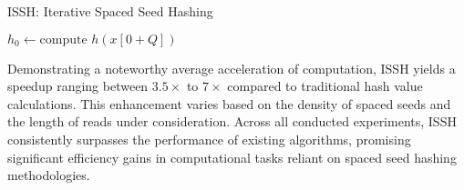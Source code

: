 \begin{algorithm}[!ht]
	\caption{ISSH: Iterative Spaced Seed Hashing}
	\label{alg:ISSH}
	$h_0 \gets \text{compute } h(x[0 + Q])$\;
\end{algorithm}

Demonstrating a noteworthy average acceleration of computation, \acs{ISSH} yields a speedup ranging between $3.5\times$ to $7\times$ compared to traditional hash value calculations. This enhancement varies based on the density of spaced seeds and the length of reads under consideration. Across all conducted experiments, \acs{ISSH} consistently surpasses the performance of existing algorithms, promising significant efficiency gains in computational tasks reliant on spaced seed hashing methodologies.
